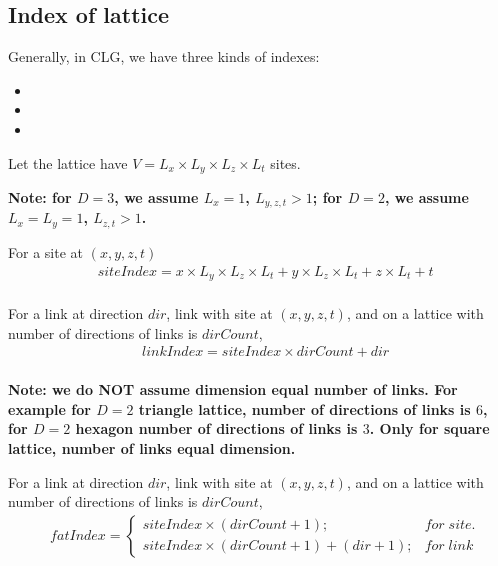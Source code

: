 \subsection{\label{index}Index of lattice}

Generally, in CLG, we have three kinds of indexes:

\begin{itemize}
\item {}
\item {}
\item {}
\end{itemize}
 
Let the lattice have $V = L_x\times L_y\times L_z\times L_t$ sites.

\textcolor[rgb]{1,0,0}{\bf Note: for $D=3$, we assume $L_x=1$, $L_{y,z,t}>1$; for $D=2$, we assume $L_x=L_y=1$, $L_{z,t}>1$. }

For a site at $(x,y,z,t)$
\begin{equation}
\begin{split}
&siteIndex=x\times L_y\times L_z\times L_t+y\times L_z\times L_t+z\times L_t+t\\
\end{split}
\end{equation}

For a link at direction $dir$, link with site at $(x,y,z,t)$, and on a lattice with number of directions of links is $dirCount$,
\begin{equation}
\begin{split}
&linkIndex=siteIndex\times dirCount+dir\\
\end{split}
\end{equation}

\textcolor[rgb]{1,0,0}{\bf Note: we do NOT assume dimension equal number of links. For example for $D=2$ triangle lattice, number of directions of links is $6$, for $D=2$ hexagon number of directions of links is $3$. Only for square lattice, number of links equal dimension.} 

For a link at direction $dir$, link with site at $(x,y,z,t)$, and on a lattice with number of directions of links is $dirCount$,
\begin{equation}
\begin{split}
&fatIndex=\left\{\begin{array}{cc}siteIndex\times (dirCount+1);&for\;site.\\ siteIndex\times (dirCount+1)+(dir+1);&for\;link\end{array}\right.\\
\end{split}
\end{equation}